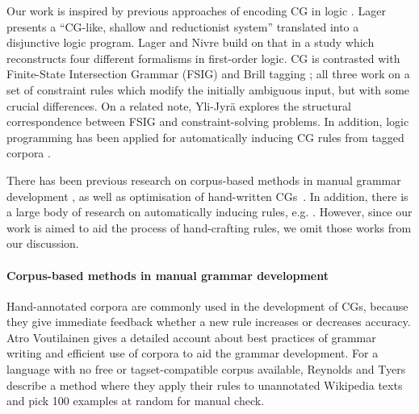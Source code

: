 

Our work is inspired by previous approaches of encoding CG in logic \cite{lager98, lager_nivre01}.
Lager \cite{lager98} presents a ``CG-like, shallow and reductionist system'' translated into a disjunctive logic program.
Lager and Nivre \cite{lager_nivre01} build on that in a study which reconstructs
four different formalisms in first-order logic. 
CG is contrasted with Finite-State Intersection Grammar (FSIG) \cite{koskenniemi90} 
and Brill tagging \cite{brill1995}; all three work on a set of constraint rules 
which modify the initially ambiguous input, but with some crucial differences.
On a related note, Yli-Jyrä \cite{yli-jyra2001} explores the structural correspondence 
between FSIG and constraint-solving problems.
In addition, logic programming has been applied for automatically inducing CG rules from tagged corpora \cite{lindberg_eineborg98ilp,asfrent14,lager01transformation}.

There has been previous research on corpus-based methods in manual grammar development \cite{voutilainen2004}, as well as optimisation of hand-written CGs~\cite{bick2013tuning}.
In addition, there is a large body of research on automatically
inducing rules, e.g. \cite{inducing_cg1996,lindberg_eineborg98ilp,lager01transformation,asfrent14}.
However, since our work is aimed to aid the process of hand-crafting rules, we omit those works from our discussion.


\paragraph{Corpus-based methods in manual grammar development}

Hand-annotated corpora are commonly used in the development of CGs, because they give immediate feedback whether a new rule increases or decreases accuracy.
Atro Voutilainen \cite{voutilainen2004} gives a detailed account about best practices of grammar writing and efficient use of corpora to aid the grammar development.
For a language with no free or tagset-compatible corpus available, Reynolds and Tyers \cite{tyers_reynolds2015} describe a method where they apply their rules to unannotated Wikipedia texts and pick 100 examples at random for manual check.

